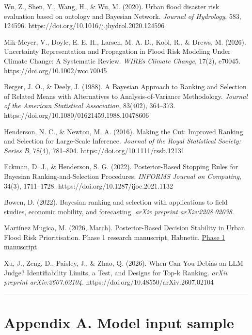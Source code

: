 \documentclass[
]{article}
\begin{document}
Wu, Z., Shen, Y., Wang, H., \& Wu, M. (2020). Urban flood disaster risk
evaluation based on ontology and Bayesian Network. \emph{Journal of
Hydrology}, 583, 124596. https://doi.org/10.1016/j.jhydrol.2020.124596

Mik-Meyer, V., Doyle, E. E. H., Larsen, M. A. D., Kool, R., \& Drews, M.
(2026). Uncertainty Representation and Propagation in Flood Risk
Modeling Under Climate Change: A Systematic Review. \emph{WIREs Climate
Change}, 17(2), e70045. https://doi.org/10.1002/wcc.70045

Berger, J. O., \& Deely, J. (1988). A Bayesian Approach to Ranking and
Selection of Related Means with Alternatives to Analysis-of-Variance
Methodology. \emph{Journal of the American Statistical Association},
83(402), 364--373. https://doi.org/10.1080/01621459.1988.10478606

Henderson, N. C., \& Newton, M. A. (2016). Making the Cut: Improved
Ranking and Selection for Large-Scale Inference. \emph{Journal of the
Royal Statistical Society: Series B}, 78(4), 781--804.
https://doi.org/10.1111/rssb.12131

Eckman, D. J., \& Henderson, S. G. (2022). Posterior-Based Stopping
Rules for Bayesian Ranking-and-Selection Procedures. \emph{INFORMS
Journal on Computing}, 34(3), 1711--1728.
https://doi.org/10.1287/ijoc.2021.1132

Bowen, D. (2022). Bayesian ranking and selection with applications to
field studies, economic mobility, and forecasting. \emph{arXiv preprint
arXiv:2208.02038}.

Martínez Mugica, M. (2026, March). Posterior-Based Decision Stability in
Urban Flood Risk Prioritisation. Phase 1 research manuscript, Habnetic.
\href{https://github.com/Habnetic/habnetic-papers/blob/master/phase1_rtm_decision_stability/phase1_rtm_decision_stability.pdf}{Phase
1 manuscript}

Xu, J., Zeng, D., Paisley, J., \& Zhao, Q. (2026). When Can You Debias
an LLM Judge? Identifiability Limits, a Test, and Designs for Top-k
Ranking. \emph{arXiv preprint arXiv:2607.02104}.
https://doi.org/10.48550/arXiv.2607.02104

\begin{center}\rule{0.5\linewidth}{0.5pt}\end{center}

\section{Appendix A. Model input
sample}\label{appendix-a.-model-input-sample}
\end{document}
